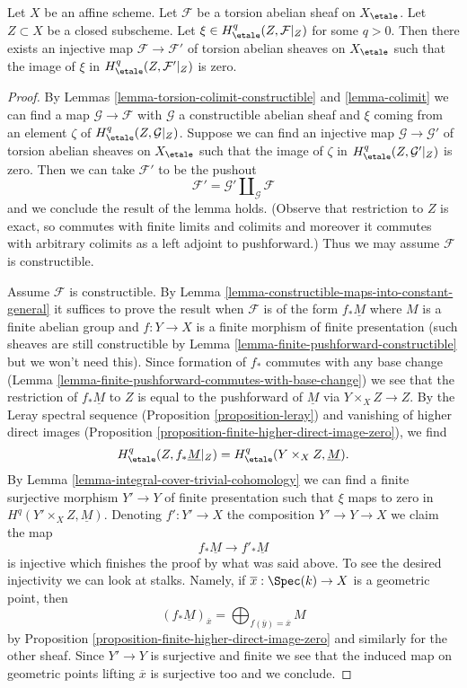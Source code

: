 \begin{lemma}
\label{lemma-efface-cohomology-on-closed-by-finite-cover}
Let $X$ be an affine scheme. Let $\mathcal{F}$ be a torsion abelian sheaf
on  $X_\etale$. Let $Z \subset X$ be a closed subscheme. Let
$\xi \in H^q_\etale(Z, \mathcal{F}|_Z)$ for some $q > 0$.
Then there exists an injective map $\mathcal{F} \to \mathcal{F}'$
of torsion abelian sheaves on $X_\etale$ such that
the image of $\xi$ in $H^q_\etale(Z, \mathcal{F}'|_Z)$ is zero.
\end{lemma}

\begin{proof}
By Lemmas \ref{lemma-torsion-colimit-constructible} and \ref{lemma-colimit}
we can find a map $\mathcal{G} \to \mathcal{F}$ with $\mathcal{G}$
a constructible abelian sheaf and $\xi$ coming from an element $\zeta$ of
$H^q_\etale(Z, \mathcal{G}|_Z)$. Suppose we can find an injective map
$\mathcal{G} \to \mathcal{G}'$ of torsion abelian sheaves on $X_\etale$
such that the image of $\zeta$ in $H^q_\etale(Z, \mathcal{G}'|_Z)$ is zero.
Then we can take $\mathcal{F}'$ to be the pushout
$$
\mathcal{F}' = \mathcal{G}' \amalg_{\mathcal{G}} \mathcal{F}
$$
and we conclude the result of the lemma holds. (Observe that restriction
to $Z$ is exact, so commutes with finite limits and colimits and moreover
it commutes with arbitrary colimits as a left adjoint to pushforward.)
Thus we may assume $\mathcal{F}$ is constructible.

\medskip\noindent
Assume $\mathcal{F}$ is constructible. By
Lemma \ref{lemma-constructible-maps-into-constant-general}
it suffices to prove the result when $\mathcal{F}$
is of the form $f_*\underline{M}$ where $M$ is a finite abelian group
and $f : Y \to X$ is a finite morphism of finite presentation
(such sheaves are still constructible by
Lemma \ref{lemma-finite-pushforward-constructible}
but we won't need this).
Since formation of $f_*$ commutes with any base change
(Lemma \ref{lemma-finite-pushforward-commutes-with-base-change})
we see that the restriction of $f_*\underline{M}$ to $Z$ is
equal to the pushforward of $\underline{M}$ via
$Y \times_X Z \to Z$. By the Leray spectral sequence
(Proposition \ref{proposition-leray})
and vanishing of higher direct images
(Proposition \ref{proposition-finite-higher-direct-image-zero}),
we find
$$
H^q_\etale(Z, f_*\underline{M}|_Z) = H^q_\etale(Y \times_X Z, \underline{M}).
$$
By Lemma \ref{lemma-integral-cover-trivial-cohomology}
we can find a finite surjective morphism $Y' \to Y$ of finite presentation
such that $\xi$ maps to zero in $H^q(Y' \times_X Z, \underline{M})$.
Denoting $f' : Y' \to X$ the composition $Y' \to Y \to X$ we claim
the map
$$
f_*\underline{M} \longrightarrow f'_*\underline{M}
$$
is injective which finishes the proof by what was said above.
To see the desired injectivity we can look at stalks. Namely,
if $\overline{x} : \Spec(k) \to X$ is a geometric point, then
$$
(f_*\underline{M})_{\overline{x}} =
\bigoplus\nolimits_{f(\overline{y}) = \overline{x}} M
$$
by Proposition \ref{proposition-finite-higher-direct-image-zero}
and similarly for the other sheaf.
Since $Y' \to Y$ is surjective and finite we see that
the induced map on geometric points lifting $\overline{x}$ is
surjective too and we conclude.
\end{proof}

